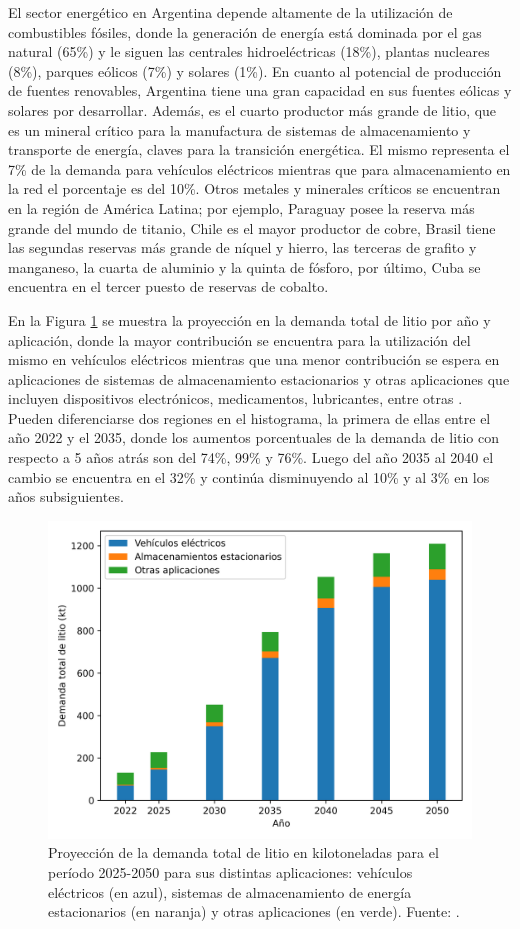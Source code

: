 El sector energético en Argentina depende altamente de la utilización de 
combustibles fósiles, donde la generación de energía está dominada por el gas 
natural (65\%) y le siguen las centrales hidroeléctricas (18\%), plantas nucleares
(8\%), parques eólicos (7\%) y solares (1\%). En cuanto al potencial de 
producción de fuentes renovables, Argentina tiene una gran capacidad en sus 
fuentes eólicas y solares por desarrollar. Además, es el cuarto productor más 
grande de litio, que es un mineral crítico para la manufactura de sistemas de 
almacenamiento y transporte de energía, claves para la transición energética. 
El mismo representa el 7\% de la demanda para vehículos eléctricos mientras que 
para almacenamiento en la red el porcentaje es del 10\%. Otros metales y 
minerales críticos se encuentran en la región de América Latina; por ejemplo, 
Paraguay posee la reserva más grande del mundo de titanio, Chile es el mayor 
productor de cobre, Brasil tiene las segundas reservas más grande de níquel y
hierro, las terceras de grafito y manganeso, la cuarta de aluminio y la quinta de 
fósforo, por último, Cuba se encuentra en el tercer puesto de reservas de cobalto.

En la Figura \ref{fig:iea-Li} se muestra la proyección en la demanda total de 
litio por año y aplicación, donde la mayor contribución se encuentra para la 
utilización del mismo en vehículos eléctricos mientras que una menor contribución 
se espera en aplicaciones de sistemas de almacenamiento estacionarios y otras 
aplicaciones que incluyen dispositivos electrónicos, medicamentos, lubricantes, 
entre otras \cite{IEA}. Pueden diferenciarse dos regiones en el histograma, la 
primera de ellas entre el año 2022 y el 2035, donde los aumentos porcentuales de 
la demanda de litio con respecto a 5 años atrás son del 74\%, 99\% y 76\%. Luego
del año 2035 al 2040 el cambio se encuentra en el 32\% y continúa disminuyendo 
al 10\% y al 3\% en los años subsiguientes.
\begin{figure}[h!]
    \centering
    \includegraphics[width=.8\textwidth]{Introduccion/energia/iea-Li.png}
    \caption{Proyección de la demanda total de litio en kilotoneladas para el 
    período 2025-2050 para sus distintas aplicaciones: vehículos eléctricos (en 
    azul), sistemas de almacenamiento de energía estacionarios (en naranja) y
    otras aplicaciones (en verde). Fuente: \cite{IEA}.}
    \label{fig:iea-Li}
\end{figure}
